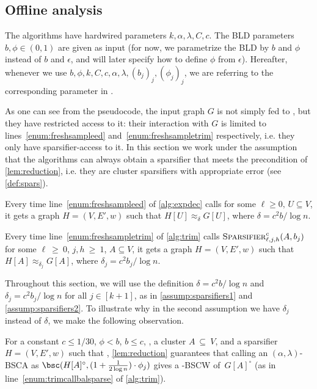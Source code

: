 \subsection{Offline analysis}
\label{subsec:offline}
The algorithms have hardwired parameters $k,\alpha,\lambda,C,c$. The BLD parameters $b,\phi \in (0,1)$ are given as input (for now, we parametrize the BLD by $b$ and $\phi$ instead of $b$ and $\epsilon$, and will later specify how to define $\phi$ from $\epsilon$).
Hereafter, whenever we use $b,\phi,k,C,c,\alpha,\lambda,(b_j)_{j},(\phi_j)_{j}$, we are referring to the corresponding parameter in .

As one can see from the pseudocode, the input graph $G$ is not simply fed to , but  they have restricted access to it: their interaction with $G$ is limited to lines~\eqref{enum:freshsampleed} and~\eqref{enum:freshsampletrim} respectively, i.e. they only have sparsifier-access to it. In this section we work under the assumption that the algorithms can always obtain a sparsifier that meets the precondition of \cref{lem:reduction}, i.e. they are cluster sparsifiers  with appropriate error (see \cref{def:spars}).

\begin{assump}
	\label{assump:sparsifiers1}
	Every time line~\eqref{enum:freshsampleed} of \cref{alg:expdec} calls  for some $\ell \ge 0,\, U \subseteq V$, it gets a graph $H=(V,E',w)$ such that $H[U] \approx_\delta G[U]$, where $\delta = c^2b/\log n$.
\end{assump}

\begin{assump}
	\label{assump:sparsifiers2}
	Every time line~\eqref{enum:freshsampletrim} of \cref{alg:trim} calls $\textsc{Sparsifier}^c_{\ell,j,h}(A,b_j)$ for some $\ell~\ge~0$, $j,h~\ge~1$, $A \subseteq V$, it gets a graph $H=(V,E',w)$ such that $H[A] \approx_{\delta_j} G[A]$, where $\delta_j = c^2b_j/\log n$.
\end{assump}

\noindent
Throughout this section, we will use the definition $\delta=c^2b/\log n$ and  $\delta_j = c^2b_j/\log n$ for all $j \in [k+1]$, as in \cref{assump:sparsifiers1} and \cref{assump:sparsifiers2}. To illustrate why in the second assumption we have $\delta_j$ instead of $\delta$, we make the following observation.
\begin{obs}
	\label{rmk:bsctrim}
	For  a constant $c \le 1/30$, $\phi < b$, $b \le c$, , a cluster $A~\subseteq~V$, and a sparsifier  $H=(V,E',w)$ such that , \cref{lem:reduction} guarantees that calling an $(\alpha,\lambda)$-BSCA as $\bsc(H[A]^\circ, (1+\frac{1}{2\log n}) \cdot \phi_j)$ gives a -BSCW of~$G[A]^\circ$  (as in line~\eqref{enum:trimcallbalsparse} of \cref{alg:trim}).
\end{obs}

